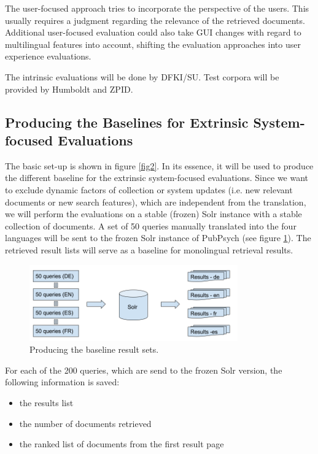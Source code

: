 \documentclass[a4paper,11pt]{article}
\begin{document}
The user-focused approach tries to incorporate the perspective of the users. This usually requires a judgment regarding the relevance of the retrieved documents. Additional user-focused evaluation could also take GUI changes with regard to multilingual features into account, shifting the evaluation approaches into user experience evaluations. 

The intrinsic evaluations will be done by DFKI/SU. Test corpora will be provided by Humboldt and ZPID. 

\subsection{Producing the Baselines for Extrinsic System-focused Evaluations}
\label{ss:baseline}
The basic set-up is shown in figure \ref{fig2}. In its essence, it will be used to produce the different baseline for the extrinsic system-focused evaluations. Since we want to exclude dynamic factors of collection or system updates (i.e. new relevant documents or new search features), which are independent from the translation, we will perform the evaluations on a stable (frozen) Solr instance with a stable collection of documents. A set of 50 queries manually translated into the four languages will be sent to the frozen Solr instance of PubPsych (see figure \ref{fig3}). The retrieved result lists will serve as a baseline for monolingual retrieval results. 

\begin{figure}[h]
	\centering
  \includegraphics[width=0.8\textwidth]{./img/queries.png}
	\caption{Producing the baseline result sets.}
	\label{fig3}
\end{figure}

For each of the 200 queries, which are send to the frozen Solr version, the following information is saved:
\begin{itemize}
\item the results list
\item the number of documents retrieved
\item the ranked list of documents from the first result page
\end{itemize}
\end{document}
